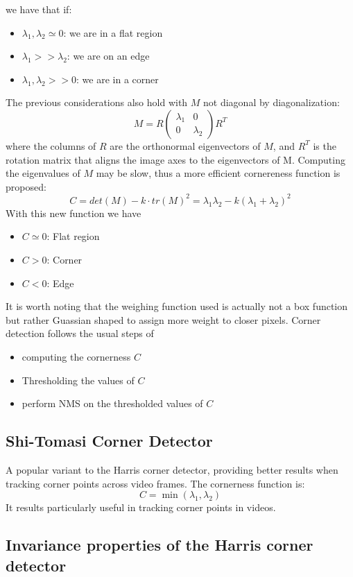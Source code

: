 \documentclass{article}
\begin{document}
we have that if: 
\begin{itemize}
  \item $\lambda_1, \lambda_2 \simeq 0$: we are in a flat region 
  \item $\lambda_1 >> \lambda_2 $: we are on an edge
  \item $\lambda_1, \lambda_2 >> 0$: we are in a corner
\end{itemize}
The previous considerations also hold with $M$ not diagonal by diagonalization:
\[
  M = R \begin{pmatrix}
    \lambda_1 & 0 \\ 0 & \lambda_2
  \end{pmatrix} R^T
\]
where the columns of $R$ are the orthonormal eigenvectors of $M$, and  $R^T$ is the rotation matrix that aligns the image axes to the eigenvectors of M.
Computing the eigenvalues of $M$ may be slow, thus a more efficient cornereness function is proposed: 
\[
  C= det(M)-k \cdot tr(M)^2 = \lambda_1\lambda_2 -k (\lambda_1+\lambda_2)^2
\]
With this new function we have 
\begin{itemize}
  \item $C \simeq 0$: Flat region
  \item $C > 0$: Corner
  \item $C < 0$: Edge
\end{itemize}
It is worth noting that the weighing function used is actually not a box function but rather Guassian shaped to assign more weight to closer pixels. Corner detection follows the usual steps of 
\begin{itemize}
  \item computing the cornerness $C$ 
  \item Thresholding the values of $C$ 
  \item perform NMS on the thresholded values of $C$
\end{itemize}
\subsection{Shi-Tomasi Corner Detector}
A popular variant to the Harris corner detector, providing better results when tracking corner points across  video frames. The cornerness function is:
\[
  C=\min(\lambda_1,\lambda_2)
\]
It results particularly useful in tracking corner points in videos. 
\subsection{Invariance properties of the Harris corner detector}
\end{document}

